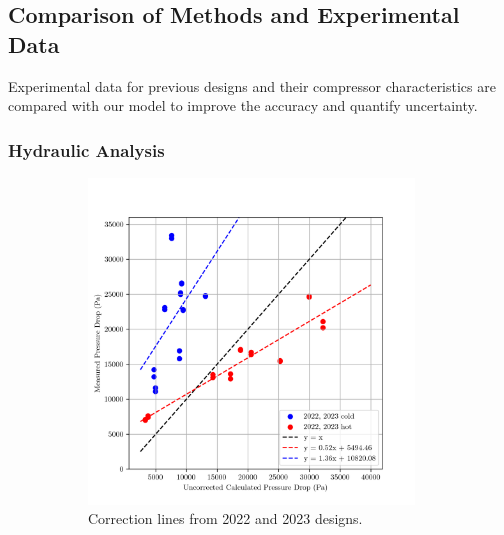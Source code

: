 \documentclass{article}
\begin{document}
\subsection{Comparison of Methods and Experimental Data}

Experimental data for previous designs and their compressor characteristics are compared with our model to improve the accuracy and quantify uncertainty.

\subsubsection{Hydraulic Analysis}

\vspace{-0.5cm}

\begin{figure}[H]
  \centering
  \begin{subfigure}{.49\textwidth}
    \centering
    \includegraphics[width=0.95\textwidth]{dp_ucalc_vs_meas.png}
    \caption{Correction lines from 2022 and 2023 designs.}
    \label{fig:uncorrected_pressure_drops}
  \end{subfigure}
  \begin{subfigure}{.49\textwidth}
    \centering

\end{subfigure}
\end{figure}
\end{document}
